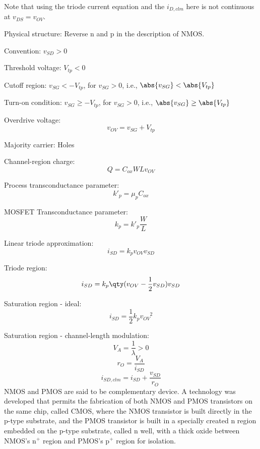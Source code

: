\documentclass[a4paper,12pt]{report}
\begin{document}
Note that using the triode current equation and the $i_{D,clm}$ here is not continuous at $v_{DS}=v_{OV}$.
\bit
\item Physical structure: Reverse n and p in the description of NMOS.
\item Convention: $v_{SD}>0$
\item Threshold voltage: $V_{tp}<0$
\item Cutoff region: $v_{SG}<-V_{tp}$, for $v_{SG}>0$, i.e., $\abs{v_{SG}}<\abs{V_{tp}}$
\item Turn-on condition: $v_{SG}\ge-V_{tp}$, for $v_{SG}>0$, i.e., $\abs{v_{SG}}\ge\abs{V_{tp}}$
\item Overdrive voltage:
\[v_{OV}=v_{SG}+V_{tp}\]
\item Majority carrier: Holes
\item Channel-region charge:
\[Q=C_{ox}WLv_{OV}\]
\item Process transconductance parameter:
\[k'_p=\mu_pC_{ox}\]
\item MOSFET Transconductance parameter:
\[k_p=k'_p\frac{W}{L}\]
\item Linear triode approximation:
\[i_{SD}=k_pv_{OV}v_{SD}\]
\item Triode region:
\[i_{SD}=k_p\qty(v_{OV}-\frac{1}{2}v_{SD})v_{SD}\]
\item Saturation region - ideal:
\[i_{SD}=\frac{1}{2}k_pv_{OV}^{\phantom{OV}2}\]
\item Saturation region - channel-length modulation:
\[V_A=\frac{1}{\lambda}>0\]
\[r_O=\frac{V_A}{i_{SD}}\]
\[i_{SD,clm}=i_{SD}+\frac{v_{SD}}{r_O}\]
\eit
NMOS and PMOS are said to be complementary device.
A technology was developed that permits the fabrication of both NMOS and PMOS transistors on the same chip, called CMOS, where the NMOS transistor is built directly in the p-type substrate, and the PMOS transistor is built in a specially created n region embedded on the p-type substrate, called n well, with a thick oxide between NMOS's n$^+$ region and PMOS's p$^+$ region for isolation.
\begin{center}
\end{center}
\end{document}
